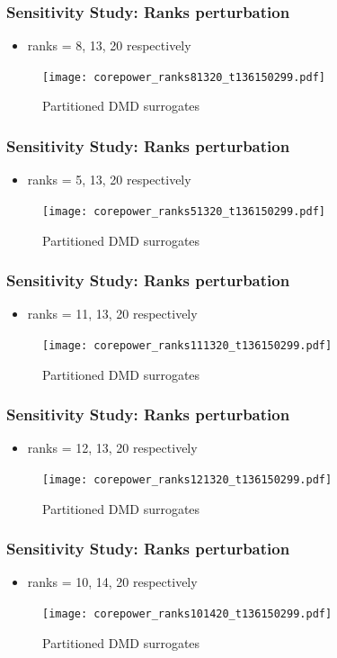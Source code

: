 \documentclass[fleqn]{beamer}
\begin{document}
\begin{frame}
\frametitle{Sensitivity Study: Ranks perturbation}
\begin{itemize}
 \item ranks = 8, 13, 20 respectively
\end{itemize}
\begin{figure}[ht]
\texttt{[image: corepower\_ranks81320\_t136150299.pdf]}
\caption{Partitioned DMD surrogates}
\end{figure}
\end{frame}

\begin{frame}
\frametitle{Sensitivity Study: Ranks perturbation}
\begin{itemize}
 \item ranks = 5, 13, 20 respectively
\end{itemize}

\begin{figure}[ht]

\texttt{[image: corepower\_ranks51320\_t136150299.pdf]}
\caption{Partitioned DMD surrogates}
\end{figure}
\end{frame}

\begin{frame}
\frametitle{Sensitivity Study: Ranks perturbation}
\begin{itemize}
 \item ranks = 11, 13, 20 respectively
\end{itemize}
\begin{figure}[ht]
\texttt{[image: corepower\_ranks111320\_t136150299.pdf]}
\caption{Partitioned DMD surrogates}
\end{figure}
\end{frame}

\begin{frame}
\frametitle{Sensitivity Study: Ranks perturbation}
\begin{itemize}
 \item ranks = 12, 13, 20 respectively
\end{itemize}

\begin{figure}[ht]

\texttt{[image: corepower\_ranks121320\_t136150299.pdf]}
\caption{Partitioned DMD surrogates}
\end{figure}
\end{frame}

\begin{frame}
\frametitle{Sensitivity Study: Ranks perturbation}
\begin{itemize}
 \item ranks = 10, 14, 20 respectively
\end{itemize}
\begin{figure}[ht]
\texttt{[image: corepower\_ranks101420\_t136150299.pdf]}
\caption{Partitioned DMD surrogates}
\end{figure}
\end{frame}
\end{document}
